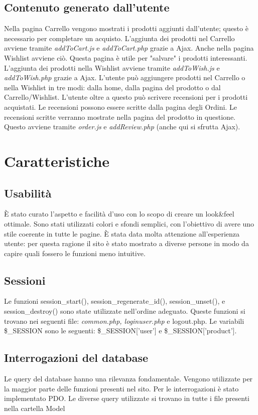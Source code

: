 \documentclass[12pt]{extarticle}
\begin{document}
\subsection{Contenuto generato dall'utente}
Nella pagina Carrello vengono mostrati i prodotti aggiunti dall'utente; questo è necessario per
completare un acquisto. L'aggiunta dei prodotti nel Carrello avviene tramite \textit{addToCart.js} e
\textit{addToCart.php} grazie a Ajax.
Anche nella pagina Wishlist avviene ciò. Questa pagina è utile per "salvare" i prodotti interessanti.
L'aggiunta dei prodotti nella Wishlist avviene tramite \textit{addToWish.js} e \textit{addToWish.php} grazie a
Ajax.
L'utente può aggiungere prodotti nel Carrello o nella Wishlist in tre modi: dalla home, dalla pagina
del prodotto o dal Carrello/Wishlist.
L'utente oltre a questo può scrivere recensioni per i prodotti acquistati. Le recensioni possono
essere scritte dalla pagina degli Ordini. Le recensioni scritte verranno mostrate nella pagina del
prodotto in questione. Questo avviene tramite \textit{order.js} e \textit{addReview.php} (anche qui si sfrutta
Ajax).



\section{Caratteristiche}
\subsection{Usabilità}
È stato curato l'aspetto e facilità d'uso con lo scopo di creare un look\&feel ottimale. Sono stati
utilizzati colori e sfondi semplici, con l'obiettivo di avere uno stile coerente in tutte le pagine. È
stata data molta attenzione all'esperienza utente: per questa ragione il sito è stato mostrato a
diverse persone in modo da capire quali fossero le funzioni meno intuitive.

\subsection{Sessioni}
Le funzioni session\_start(), session\_regenerate\_id(), session\_unset(), e
session\_destroy() sono state utilizzate nell'ordine adeguato. Queste funzioni si trovano nei
seguenti file: \textit{common.php, loginuser.php} e logout.php.
Le variabili \$\_SESSION sono le seguenti: \$\_SESSION['user'] e \$\_SESSION['product'].

\subsection{Interrogazioni del database}
Le query del database hanno una rilevanza fondamentale. Vengono utilizzate per la maggior parte
delle funzioni presenti nel sito. Per le interrogazioni è stato implementato PDO. Le diverse query
utilizzate si trovano in tutte i file presenti nella cartella Model
\end{document}
